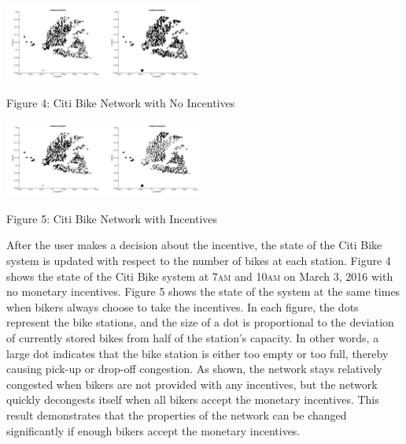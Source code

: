 \documentclass[times, 10pt,twocolumn]{article}
\begin{document}
\hfill \break
\centerline{\includegraphics[width=0.25\textwidth]{m4/no_incentives_before.png}\includegraphics[width=0.25\textwidth]{m4/no_incentives_after.png}}
\centerline{Figure 4: Citi Bike Network with No Incentives}
\hfill \break
\centerline{\includegraphics[width=0.25\textwidth]{m4/incentives_before.png}\includegraphics[width=0.25\textwidth]{m4/incentives_after.png}}
\centerline{Figure 5: Citi Bike Network with Incentives}
\hfill \break
\indent After the user makes a decision about the incentive, the state of the Citi Bike system is updated with respect to the number of bikes at each station. Figure 4 shows the state of the Citi Bike system at 7\textsc{am} and 10\textsc{am} on March 3, 2016 with no monetary incentives. Figure 5 shows the state of the system at the same times when bikers always choose to take the incentives. In each figure, the dots represent the bike stations, and the size of a dot is proportional to the deviation of currently stored bikes from half of the station's capacity. In other words, a large dot indicates that the bike station is either too empty or too full, thereby causing pick-up or drop-off congestion. As shown, the network stays relatively congested when bikers are not provided with any incentives, but the network quickly decongests itself when all bikers accept the monetary incentives. This result demonstrates that the properties of the network can be changed significantly if enough bikers accept the monetary incentives.
\end{document}
